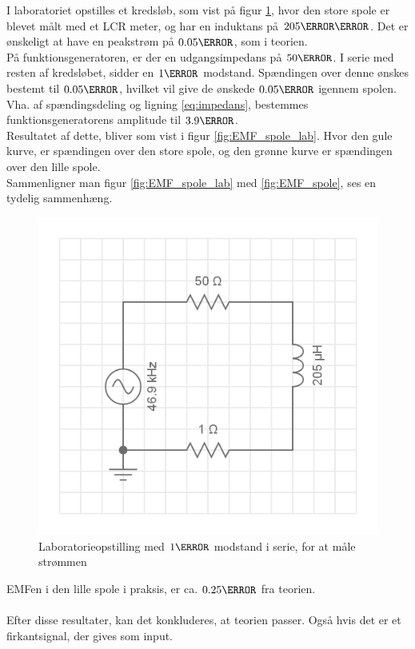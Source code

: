 I laboratoriet opstilles et kredsløb, som vist på figur \ref{fig:kredslob_spole}, hvor den store spole er blevet målt med et LCR meter, og har en induktans på $205\micro\henry$.
Det er ønskeligt at have en peakstrøm på $0.05 \ampere$, som i teorien.\\
På funktionsgeneratoren, er der en udgangsimpedans på $50\ohm$.
I serie med resten af kredsløbet, sidder en $1\ohm$ modstand. Spændingen over denne ønskes bestemt til $0.05\volt$, hvilket vil give de ønskede $0.05\ampere$ igennem spolen.
Vha. af spændingsdeling og ligning \ref{eq:impedans}, bestemmes funktionsgeneratorens amplitude til $3.9\volt$.\\
Resultatet af dette, bliver som vist i figur \ref{fig:EMF_spole_lab}.
Hvor den gule kurve, er spændingen over den store spole, og den grønne kurve er spændingen over den lille spole.\\
Sammenligner man figur \ref{fig:EMF_spole_lab} med \ref{fig:EMF_spole}, ses en tydelig sammenhæng.\\
\begin{figure}
	\centering
	\includegraphics[width=.5\textwidth]{billeder/circuit_spole.png}
	\caption{Laboratorieopstilling med $1\ohm$ modstand i serie, for at måle strømmen}
	\label{fig:kredslob_spole}
\end{figure}
EMFen i den lille spole i praksis, er ca. $0.25\volt$ fra teorien.\\ \\
Efter disse resultater, kan det konkluderes, at teorien passer. 
Også hvis det er et firkantsignal, der gives som input.\\

